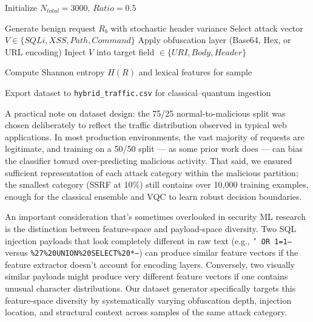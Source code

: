 \documentclass[journal,onecolumn]{IEEEtran}
\begin{document}
\begin{algorithm}[h]
\caption{Strategic Dataset Synthesis}
\label{alg:dataset_synthesis}
\begin{algorithmic}[1]

\State Initialize $N_{total} = 3000$, $Ratio = 0.5$


        \State Generate benign request $R_b$ with stochastic header variance
    \Else
        \State Select attack vector $V \in \{SQLi, XSS, Path, Command\}$
        \State Apply obfuscation layer (Base64, Hex, or URL encoding)
        \State Inject $V$ into target field $\in \{URI, Body, Header\}$
    \EndIf

    \State Compute Shannon entropy $H(R)$ and lexical features for sample

\EndFor

\State Export dataset to \texttt{hybrid\_traffic.csv} for classical--quantum ingestion

\end{algorithmic}
\end{algorithm}

A practical note on dataset design: the 75/25 normal-to-malicious split was chosen deliberately to reflect the traffic distribution observed in typical web applications. In most production environments, the vast majority of requests are legitimate, and training on a 50/50 split --- as some prior work does --- can bias the classifier toward over-predicting malicious activity. That said, we ensured sufficient representation of each attack category within the malicious partition; the smallest category (SSRF at 10\%) still contains over 10,000 training examples, enough for the classical ensemble and VQC to learn robust decision boundaries.

An important consideration that's sometimes overlooked in security ML research is the distinction between feature-space and payload-space diversity. Two SQL injection payloads that look completely different in raw text (e.g., \texttt{' OR 1=1--} versus \texttt{\%27\%20UNION\%20SELECT\%20*--}) can produce similar feature vectors if the feature extractor doesn't account for encoding layers. Conversely, two visually similar payloads might produce very different feature vectors if one contains unusual character distributions. Our dataset generator specifically targets this feature-space diversity by systematically varying obfuscation depth, injection location, and structural context across samples of the same attack category.
\end{document}
